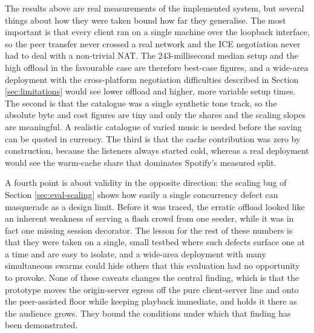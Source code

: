 \indent \par The results above are real measurements of the implemented system, but several things about how they were taken bound how far they generalise. The most important is that every client ran on a single machine over the loopback interface, so the peer transfer never crossed a real network and the ICE negotiation never had to deal with a non-trivial NAT. The 243-millisecond median setup and the high offload in the favourable case are therefore best-case figures, and a wide-area deployment with the cross-platform negotiation difficulties described in Section \ref{sec:limitations} would see lower offload and higher, more variable setup times. The second is that the catalogue was a single synthetic tone track, so the absolute byte and cost figures are tiny and only the shares and the scaling slopes are meaningful. A realistic catalogue of varied music is needed before the saving can be quoted in currency. The third is that the cache contribution was zero by construction, because the listeners always started cold, whereas a real deployment would see the warm-cache share that dominates Spotify's measured split.

\par A fourth point is about validity in the opposite direction: the scaling bug of Section \ref{sec:eval-scaling} shows how easily a single concurrency defect can masquerade as a design limit. Before it was traced, the erratic offload looked like an inherent weakness of serving a flash crowd from one seeder, while it was in fact one missing session decorator. The lesson for the rest of these numbers is that they were taken on a single, small testbed where such defects surface one at a time and are easy to isolate, and a wide-area deployment with many simultaneous swarms could hide others that this evaluation had no opportunity to provoke. None of these caveats changes the central finding, which is that the prototype moves the origin-server egress off the pure client-server line and onto the peer-assisted floor while keeping playback immediate, and holds it there as the audience grows. They bound the conditions under which that finding has been demonstrated.

